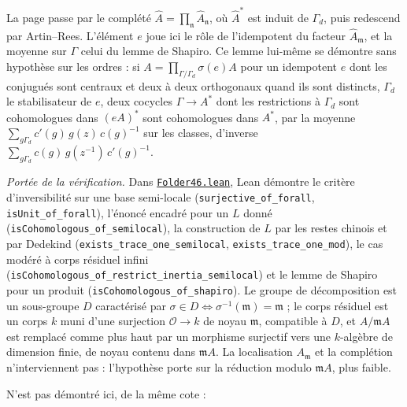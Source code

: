 La page passe par le complété $\hat A = \prod_{\mathfrak n} \hat A_{\mathfrak n}$, où $\hat A^*$ est induit de $\Gamma_d$, puis redescend par Artin--Rees. L'élément $e$ joue ici le rôle de l'idempotent du facteur $\hat A_{\mathfrak m}$, et la moyenne sur $\Gamma$ celui du lemme de Shapiro. Ce lemme lui-même se démontre sans hypothèse sur les ordres : si $A = \prod_{\Gamma/\Gamma_d} \sigma(e)A$ pour un idempotent $e$ dont les conjugués sont centraux et deux à deux orthogonaux quand ils sont distincts, $\Gamma_d$ le stabilisateur de $e$, deux cocycles $\Gamma \to A^*$ dont les restrictions à $\Gamma_d$ sont cohomologues dans $(eA)^*$ sont cohomologues dans $A^*$, par la moyenne $\sum_{g\Gamma_d} c'(g)\,g(z)\,c(g)^{-1}$ sur les classes, d'inverse $\sum_{g\Gamma_d} c(g)\,g(z^{-1})\,c'(g)^{-1}$.

\begin{sloppypar}
\begingroup\raggedright
\noindent\emph{Portée de la vérification.} Dans \href{\leanblob/RingTheory/Folder46.lean}{\texttt{Folder46.\allowbreak{}lean}}, Lean démontre le critère d'inversibilité sur une base semi-locale (\texttt{surjective\_of\_forall}, \texttt{isUnit\_of\_forall}), l'énoncé encadré pour un $L$ donné (\texttt{isCohomologous\_of\_semilocal}), la construction de $L$ par les restes chinois et par Dedekind (\texttt{exists\_trace\_one\_semilocal}, \texttt{exists\_trace\_one\_mod}), le cas modéré à corps résiduel infini (\texttt{isCohomologous\_of\_restrict\_inertia\_semilocal}) et le lemme de Shapiro pour un produit (\texttt{isCohomologous\_of\_shapiro}). Le groupe de décomposition est un sous-groupe $D$ caractérisé par $\sigma \in D \iff \sigma^{-1}(\mathfrak m) = \mathfrak m$ ; le corps résiduel est un corps $k$ muni d'une surjection $\mathcal O \to k$ de noyau $\mathfrak m$, compatible à $D$, et $A/\mathfrak mA$ est remplacé comme plus haut par un morphisme surjectif vers une $k$-algèbre de dimension finie, de noyau contenu dans $\mathfrak mA$. La localisation $A_{\mathfrak m}$ et la complétion n'interviennent pas : l'hypothèse porte sur la réduction modulo $\mathfrak mA$, plus faible.
\end{sloppypar}\par\endgroup

N'est pas démontré ici, de la même cote :

